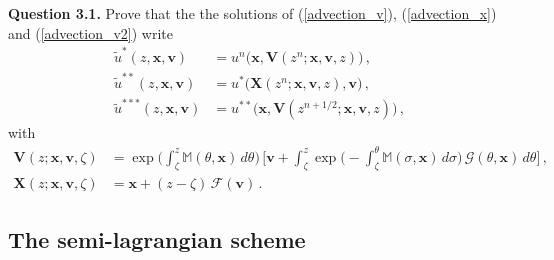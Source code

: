 \documentclass[10pt]{article}
\begin{document}
\begin{leftbar}
\textbf{Question 3.1.} Prove that the the solutions of (\ref{advection_v}), (\ref{advection_x}) and (\ref{advection_v2}) write
\begin{equation}
\begin{split}
\tilde{u}^{*}(z,\mathbf{x},\mathbf{v}) &= u^{n}\big(\mathbf{x},\mathbf{V}(z^{n};\mathbf{x},\mathbf{v},z)\big) \, , \\
\tilde{u}^{**}(z,\mathbf{x},\mathbf{v}) &= u^{*}\big(\mathbf{X}(z^{n};\mathbf{x},\mathbf{v},z),\mathbf{v}\big) \, , \\
\tilde{u}^{***}(z,\mathbf{x},\mathbf{v}) &= u^{**}\big(\mathbf{x},\mathbf{V}(z^{n+1/2};\mathbf{x},\mathbf{v},z)\big) \, ,
\end{split}
\end{equation}
with
\begin{equation} \label{charac_solutions}
\begin{split}
\mathbf{V}(z;\mathbf{x},\mathbf{v},\zeta) &= \exp\Big( \int_{\zeta}^{z}\mathbb{M}(\theta,\mathbf{x})\,d\theta \Big)\, \Bigg[ \mathbf{v} + \int_{\zeta}^{z} \exp\Big(-\int_{\zeta}^{\theta} \mathbb{M}(\sigma,\mathbf{x})\,d\sigma \Big) \, \bm{\mathcal{G}}(\theta,\mathbf{x}) \, d\theta \Bigg] \, , \\
\mathbf{X}(z;\mathbf{x},\mathbf{v},\zeta) &= \mathbf{x} + (z-\zeta)\,\bm{\mathcal{F}}(\mathbf{v}) \, .
\end{split}
\end{equation}
\end{leftbar}


\subsection{The semi-lagrangian scheme}
\end{document}
